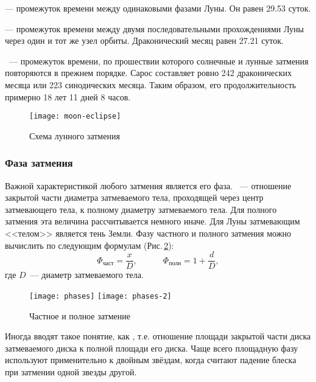  --- промежуток времени между одинаковыми фазами Луны. Он равен 29.53 суток.

 --- промежуток времени между двумя последовательными прохождениями Луны через один и тот же узел орбиты. Драконический месяц равен 27.21 суток.

~--- промежуток  времени, по прошествии которого солнечные и 
лунные затмения повторяются в прежнем порядке. Сарос составляет ровно 242 драконических месяца или 223 синодических месяца. Таким образом, его продолжительность примерно 18 лет 11 дней 8 часов.

\begin{figure}[h!]
\centering
\texttt{[image: moon-eclipse]}
\caption{Схема лунного затмения}
\label{fig:moon-eclipse-scheme}
\end{figure}

\subsubsection{Фаза затмения}
Важной характеристикой любого затмения является его фаза. ~--- отношение закрытой части диаметра затмеваемого тела, проходящей через центр затмевающего тела, к полному диаметру затмеваемого тела. Для полного затмения эта величина рассчитывается немного иначе. Для Луны затмевающим <<телом>> является тень Земли. Фазу частного и полного затмения можно вычислить по следующим формулам (Рис.\,\ref{fig:part-eclipses-scheme}):\begin{equation}
\Phi_{\text{част}} = \frac{x}{D}, \quad \quad \quad \Phi_{\text{полн}} = 1 + \frac{d}{D},
\end{equation}
где $D$~--- диаметр затмеваемого тела.
\begin{figure}[h!]
\centering
\texttt{[image: phases]}
\texttt{[image: phases-2]}
\caption{Частное и полное затмение}
\label{fig:part-eclipses-scheme}
\end{figure}

Иногда вводят такое понятие, как , т.е. отношение площади закрытой части диска затмеваемого диска к полной площади его диска. Чаще всего  площадную фазу используют применительно к двойным звёздам, когда считают падение блеска при затмении одной звезды другой.

